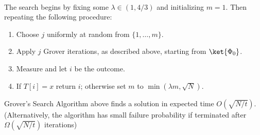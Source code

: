 \paragraph{}
The search begins by fixing some $\lambda \in (1,4/3)$ and initializing $m=1$. Then repeating the following procedure:
\begin{enumerate}
\item Choose $j$ uniformly at random from $\{1, \dots, m\}$.
\item Apply $j$ Grover iterations, as described above, starting from $\ket{\Phi_0}$.
\item Measure and let $i$ be the outcome.
\item If $T[i] = x$ return $i$; otherwise set $m$ to $\min(\lambda m, \sqrt{N})$.
\end{enumerate}
\begin{theorem}\label{th:grovers}
Grover's Search Algorithm above finds a solution in expected time $O(\sqrt{N/t})$. (Alternatively, the algorithm has small failure probability if terminated after $\Omega(\sqrt{N/t})$ iterations)
\end{theorem}
